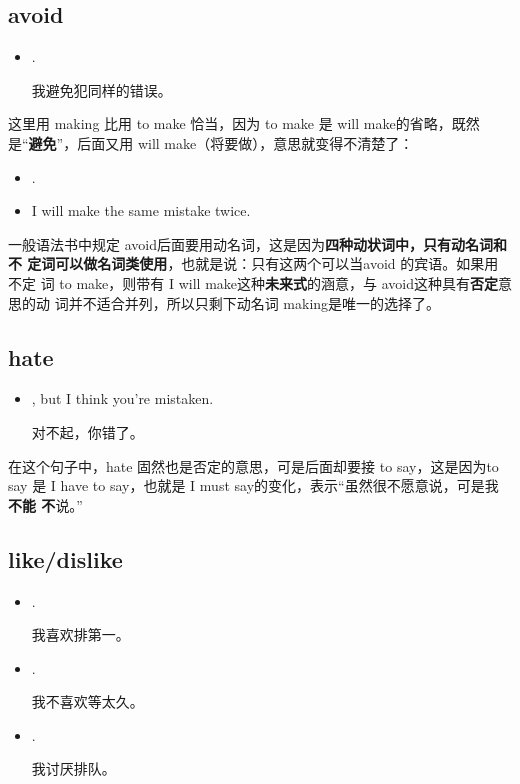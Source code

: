 \subsection{avoid}

\begin{itemize}
\item  {}  .

  我避免犯同样的错误。
\end{itemize}

这里用 making 比用 to make 恰当，因为 to make 是 will make的省略，既然
是“\textbf{避免}”，后面又用 will make（将要做），意思就变得不清楚了：

\begin{itemize}
\item  {}  .
\item  I will make the same mistake twice.
\end{itemize}

一般语法书中规定 avoid后面要用动名词，这是因为\textbf{四种动状词中，只有动名词和不
  定词可以做名词类使用}，也就是说：只有这两个可以当avoid 的宾语。如果用不定
词 to make，则带有 I will make这种\textbf{未来式}的涵意，与 avoid这种具有\textbf{否定}意思的动
词并不适合并列，所以只剩下动名词 making是唯一的选择了。

\subsection{hate}

\begin{itemize}
\item  {}  , but I think you're
  mistaken.

  对不起，你错了。
\end{itemize}

在这个句子中，hate 固然也是否定的意思，可是后面却要接 to say，这是因为to say
是 I have to say，也就是 I must say的变化，表示“虽然很不愿意说，可是我\textbf{不能
  不}说。”

\subsection{like/dislike}

\begin{itemize}
\item {}  .

  我喜欢排第一。
\item {}  .

  我不喜欢等太久。
\item {}  .

  我讨厌排队。
\end{itemize}

